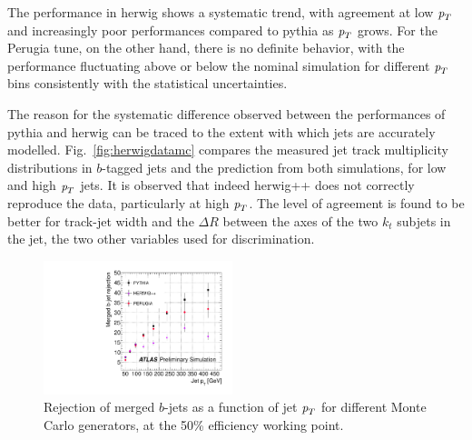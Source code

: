 
The performance in {\sc herwig} shows a systematic trend, with agreement at low ${\emph{p}_{T}}$ and increasingly poor performances compared to {\sc pythia} as ${\emph{p}_{T}}$ grows. For the Perugia tune, on the other hand, there is no definite behavior, with the performance fluctuating above or below the nominal simulation for different ${\emph{p}_{T}}$ bins consistently with the statistical uncertainties.

The reason for the systematic difference observed between the performances of {\sc pythia} and {\sc herwig} can be traced to the extent with which jets are accurately modelled. Fig.~\ref{fig:herwigdatamc} compares the measured jet track multiplicity distributions in $b$-tagged jets and the prediction from both simulations, for low and high ${\emph{p}_{T}}$ jets. It is observed that indeed {\sc herwig++} does not correctly reproduce the data, particularly at high ${\emph{p}_{T}}$. The level of agreement is found to be better for track-jet width and the $\Delta R$ between the axes of the two $k_t$ subjets in the jet, the two other variables used for discrimination.






\begin{figure}[tp]
\centering
\includegraphics[width=0.49\textwidth]{gbbRejection_vs_PT_3MonteCarlos_50Eff.pdf}
\caption{Rejection of merged $b$-jets as a function of jet ${\emph{p}_{T}}$ for different Monte Carlo generators, at the 50\% efficiency working point.}
\label{fig:performanceotherMC}
\end{figure}

